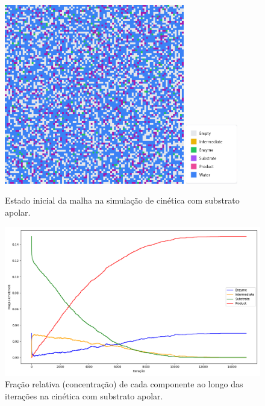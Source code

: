 \documentclass[12pt,oneside]{report}
\begin{document}
\begin{figure}[H]
    \centering
    \includegraphics[width=0.7\textwidth]{img/MM_apolar_initial.png}
    \hspace{0.05\textwidth}
    \includegraphics[width=0.2\textwidth]{img/legend.png}
    \caption{\small Estado inicial da malha na simulação de cinética com substrato apolar.}
    \label{fig:MM_apolar_initial}
\end{figure}

\begin{figure}[H]
    \centering
    \includegraphics[width=1\textwidth]{img/MM_apolar_conc.png}
    \caption{\small Fração relativa (concentração) de cada componente ao longo das iterações na cinética com substrato apolar.}
    \label{fig:MM_apolar_conc}
\end{figure}
\end{document}
